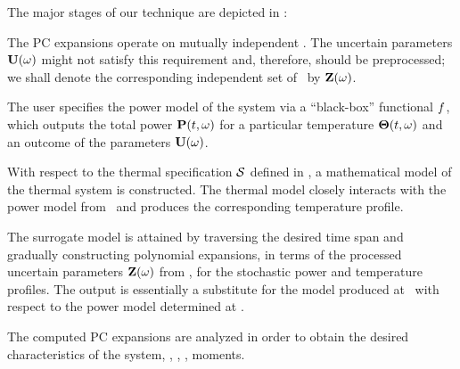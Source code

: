The major stages of our technique are depicted in :

 The PC expansions operate on mutually independent \rvs. The uncertain parameters $\mathbf{U}(\omega)$ might not satisfy this requirement and, therefore, should be preprocessed; we shall denote the corresponding independent set of \rvs\ by $\mathbf{Z}(\omega)$.

 The user specifies the power model of the system via a ``black-box'' functional $f$, which outputs the total power $\mathbf{P}(t, \omega)$ for a particular temperature ${\boldsymbol\Theta}(t, \omega)$ and an outcome of the parameters $\mathbf{U}(\omega)$.

 With respect to the thermal specification $\mathcal{S}$ defined in , a mathematical model of the thermal system is constructed. The thermal model closely interacts with the power model from \ and produces the corresponding temperature profile.

 The surrogate model is attained by traversing the desired time span and gradually constructing polynomial expansions, in terms of the processed uncertain parameters $\mathbf{Z}(\omega)$ from , for the stochastic power and temperature profiles. The output is essentially a substitute for the model produced at \ with respect to the power model determined at .

 The computed PC expansions are analyzed in order to obtain the desired characteristics of the system, \eg, \cdfs, \pdfs, moments.
